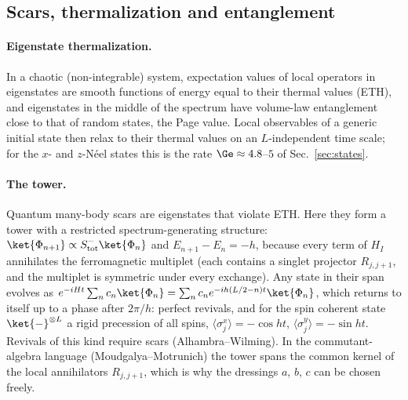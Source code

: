 \subsection{Scars, thermalization and entanglement}
\label{sec:theory-scars}

\paragraph{Eigenstate thermalization.} In a chaotic (non-integrable) system, expectation values of local operators in eigenstates are smooth functions of energy equal to their thermal values (ETH), and eigenstates in the middle of the spectrum have volume-law entanglement close to that of random states, the Page value. Local observables of a generic initial state then relax to their thermal values on an $L$-independent time scale; for the $x$- and $z$-N\'eel states this is the rate $\Ge \approx 4.8$--$5$ of Sec.~\ref{sec:states}.

\paragraph{The tower.} Quantum many-body scars are eigenstates that violate ETH. Here they form a tower with a restricted spectrum-generating structure: $\ket{\Phi_{n+1}} \propto S^-_{\mathrm{tot}}\ket{\Phi_n}$ and $E_{n+1} - E_n = -h$, because every term of $H_I$ annihilates the ferromagnetic multiplet (each contains a singlet projector $R_{j,j+1}$, and the multiplet is symmetric under every exchange). Any state in their span evolves as $e^{-iHt}\sum_nc_n\ket{\Phi_n} = \sum_n c_n e^{-ih(L/2-n)t}\ket{\Phi_n}$, which returns to itself up to a phase after $2\pi/h$: perfect revivals, and for the spin coherent state $\ket{-}^{\otimes L}$ a rigid precession of all spins, $\langle\sigma^x_j\rangle = -\cos ht$, $\langle\sigma^y_j\rangle = -\sin ht$. Revivals of this kind require scars (Alhambra--Wilming). In the commutant-algebra language (Moudgalya--Motrunich) the tower spans the common kernel of the local annihilators $R_{j,j+1}$, which is why the dressings $a$, $b$, $c$ can be chosen freely.

